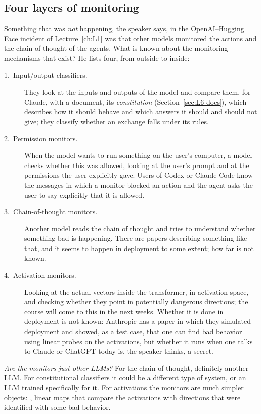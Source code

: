 \subsection{Four layers of monitoring}\label{sec:L6-monitors}
Something that was \emph{not} happening, the speaker says, in the OpenAI--Hugging Face incident of Lecture~\ref{ch:L1} was that other models monitored the actions and the chain of thought of the agents. What is known about the monitoring mechanisms that exist? He lists four, from outside to inside:
\begin{description}
  \item[1.\ Input/output classifiers.] They look at the inputs and outputs of the model and compare them, for Claude, with a document, its \emph{constitution} (Section~\ref{sec:L6-docs}), which describes how it should behave and which answers it should and should not give; they classify whether an exchange falls under its rules.
  \item[2.\ Permission monitors.] When the model wants to run something on the user's computer, a model checks whether this was allowed, looking at the user's prompt and at the permissions the user explicitly gave. Users of Codex or Claude Code know the messages in which a monitor blocked an action and the agent asks the user to say explicitly that it is allowed.
  \item[3.\ Chain-of-thought monitors.] Another model reads the chain of thought and tries to understand whether something bad is happening. There are papers describing something like that, and it seems to happen in deployment to some extent; how far is not known.
  \item[4.\ Activation monitors.] Looking at the actual vectors inside the transformer, in activation space, and checking whether they point in potentially dangerous directions; the course will come to this in the next weeks. Whether it is done in deployment is not known: Anthropic has a paper in which they simulated deployment and showed, as a test case, that one can find bad behavior using linear probes on the activations, but whether it runs when one talks to Claude or ChatGPT today is, the speaker thinks, a secret.
\end{description}
\emph{Are the monitors just other LLMs?} For the chain of thought, definitely another LLM. For constitutional classifiers it could be a different type of system, or an LLM trained specifically for it. For activations the monitors are much simpler objects: , linear maps that compare the activations with directions that were identified with some bad behavior.

